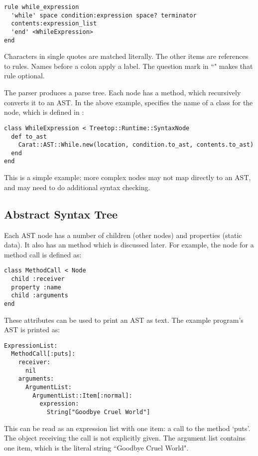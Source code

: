 \begin{lstlisting}[language=treetop]
rule while_expression
  'while' space condition:expression space? terminator
  contents:expression_list
  'end' <WhileExpression>
end
\end{lstlisting}

Characters in single quotes are matched literally. The other items are references to rules. Names before a colon apply a label. The question mark in ``" makes that rule optional.

The parser produces a parse tree. Each node has a  method, which recursively converts it to an AST. In the above example,  specifies the name of a class for the node, which is defined in :

\begin{lstlisting}
class WhileExpression < Treetop::Runtime::SyntaxNode
  def to_ast
    Carat::AST::While.new(location, condition.to_ast, contents.to_ast)
  end
end
\end{lstlisting}

This is a simple example: more complex nodes may not map directly to an AST, and may need to do additional syntax checking.

\subsection{Abstract Syntax Tree}

Each AST node has a number of children (other nodes) and properties (static data). It also has an  method which is discussed later. For example, the node for a method call is defined as:

\begin{lstlisting}
class MethodCall < Node
  child :receiver
  property :name
  child :arguments
end
\end{lstlisting}

These attributes can be used to print an AST as text. The example program's AST is printed as:

\begin{verbatim}
ExpressionList:
  MethodCall[:puts]:
    receiver:
      nil
    arguments:
      ArgumentList:
        ArgumentList::Item[:normal]:
          expression:
            String["Goodbye Cruel World"]
\end{verbatim}

This can be read as an expression list with one item: a call to the method `puts'. The object receiving the call is not explicitly given. The argument list contains one item, which is the literal string ``Goodbye Cruel World".

